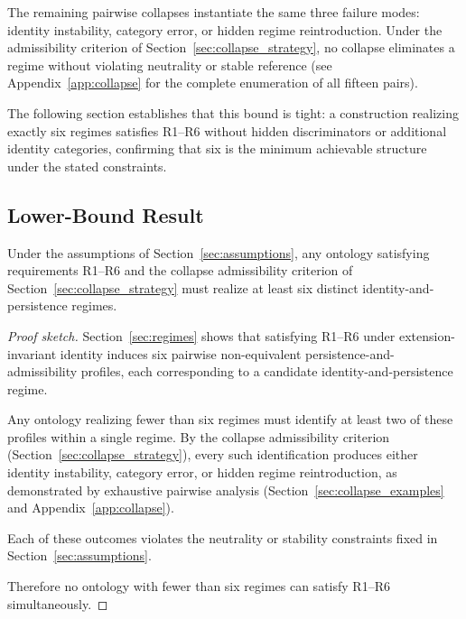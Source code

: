 The remaining pairwise collapses instantiate the same three failure modes:
identity instability, category error, or hidden regime reintroduction.
Under the admissibility criterion of Section~\ref{sec:collapse_strategy},
no collapse eliminates a regime without violating neutrality or stable
reference (see Appendix~\ref{app:collapse} for the complete enumeration
of all fifteen pairs).

The following section establishes that this bound is tight:
a construction realizing exactly six regimes satisfies R1--R6
without hidden discriminators or additional identity categories,
confirming that six is the minimum achievable structure
under the stated constraints.

\subsection{Lower-Bound Result}

\begin{lemma}
\label{lem:necessity}
Under the assumptions of Section~\ref{sec:assumptions},
any ontology satisfying requirements R1--R6
and the collapse admissibility criterion of
Section~\ref{sec:collapse_strategy}
must realize at least six distinct
identity-and-persistence regimes.
\end{lemma}

\begin{proof}[Proof sketch]
Section~\ref{sec:regimes} shows that satisfying R1--R6
under extension-invariant identity induces six
pairwise non-equivalent persistence-and-admissibility profiles,
each corresponding to a candidate identity-and-persistence regime.

Any ontology realizing fewer than six regimes must
identify at least two of these profiles within a single regime.
By the collapse admissibility criterion
(Section~\ref{sec:collapse_strategy}),
every such identification produces either
identity instability, category error, or hidden regime reintroduction,
as demonstrated by exhaustive pairwise analysis (Section~\ref{sec:collapse_examples}
and Appendix~\ref{app:collapse}).

Each of these outcomes violates the neutrality
or stability constraints fixed in
Section~\ref{sec:assumptions}.

Therefore no ontology with fewer than six regimes
can satisfy R1--R6 simultaneously.
\end{proof}

